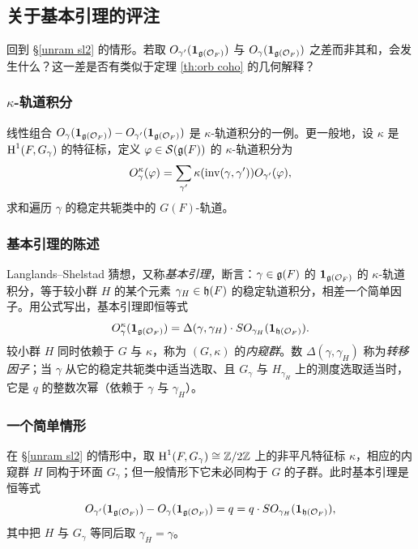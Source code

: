 \subsection{关于基本引理的评注} 回到 \S\ref{unram sl2} 的情形。若取 $O_{\gamma'}(\mathbf{1}_{\mathfrak{g}(\mathcal{O}_{F})})$ 与 $O_{\gamma}(\mathbf{1}_{\mathfrak{g}(\mathcal{O}_{F})})$ 之差而非其和，会发生什么？这一差是否有类似于定理 \ref{th:orb coho} 的几何解释？

\subsubsection{$\kappa$-轨道积分} 线性组合 $O_{\gamma}(\mathbf{1}_{\mathfrak{g}(\mathcal{O}_{F})})-O_{\gamma'}(\mathbf{1}_{\mathfrak{g}(\mathcal{O}_{F})})$ 是 $\kappa$-轨道积分的一例。更一般地，设 $\kappa$ 是 $\textup{H}^{1}({F,G_{\gamma}})$ 的特征标，定义 $\varphi\in \mathcal{S}(\mathfrak{g}(F))$ 的 $\kappa$-轨道积分为
\begin{equation*}
O^{\kappa}_{\gamma}(\varphi)=\sum_{\gamma'}\kappa(\textup{inv}(\gamma,\gamma'))O_{\gamma'}(\varphi),
\end{equation*}
求和遍历 $\gamma$ 的稳定共轭类中的 $G(F)$-轨道。

\subsubsection{基本引理的陈述} Langlands--Shelstad 猜想，又称{\em 基本引理}，断言：$\gamma\in\mathfrak{g}(F)$ 的 $\mathbf{1}_{\mathfrak{g}(\mathcal{O}_{F})}$ 的 $\kappa$-轨道积分，等于较小群 $H$ 的某个元素 $\gamma_{H}\in\mathfrak{h}(F)$ 的稳定轨道积分，相差一个简单因子。用公式写出，基本引理即恒等式
\begin{equation*}
O^{\kappa}_{\gamma}(\mathbf{1}_{\mathfrak{g}(\mathcal{O}_{F})})=\Delta(\gamma,\gamma_{H})\cdot SO_{\gamma_{H}}(\mathbf{1}_{\mathfrak{h}(\mathcal{O}_{F})}).
\end{equation*}
较小群 $H$ 同时依赖于 $G$ 与 $\kappa$，称为 $(G,\kappa)$ 的{\em 内窥群}。数 $\Delta(\gamma,\gamma_{H})$ 称为{\em 转移因子}；当 $\gamma$ 从它的稳定共轭类中适当选取、且 $G_{\gamma}$ 与 $H_{\gamma_{H}}$ 上的测度选取适当时，它是 $q$ 的整数次幂（依赖于 $\gamma$ 与 $\gamma_{H}$）。

\subsubsection{一个简单情形} 在 \S\ref{unram sl2} 的情形中，取 $\textup{H}^{1}({F,G_{\gamma}})\cong\mathbb{Z}/2\mathbb{Z}$ 上的非平凡特征标 $\kappa$，相应的内窥群 $H$ 同构于环面 $G_{\gamma}$；但一般情形下它未必同构于 $G$ 的子群。此时基本引理是恒等式
\begin{equation*}
O_{\gamma'}(\mathbf{1}_{\mathfrak{g}(\mathcal{O}_{F})})-O_{\gamma}(\mathbf{1}_{\mathfrak{g}(\mathcal{O}_{F})})=q=q\cdot SO_{\gamma_{H}}(\mathbf{1}_{\mathfrak{h}(\mathcal{O}_{F})}),
\end{equation*}
其中把 $H$ 与 $G_{\gamma}$ 等同后取 $\gamma_{H}=\gamma$。


